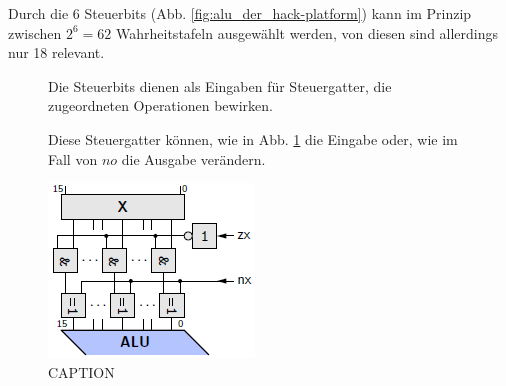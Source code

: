 \documentclass[12pt]{report}
\begin{document}
Durch die 6 Steuerbits (Abb. \ref{fig:alu_der_hack-platform}) kann im Prinzip zwischen 
$2^6=62$ Wahrheitstafeln ausgewählt werden, von diesen sind allerdings nur 18 relevant.

\begin{defbox}
  \begin{figure}[H]
    \begin{minipage}[t]{0.45\textwidth}
      Die Steuerbits dienen als Eingaben für Steuergatter, die zugeordneten
      Operationen bewirken.

      Diese Steuergatter können, wie in Abb. \ref{fig:alu_steuerbits} die Eingabe oder,
      wie im Fall von $no$ die Ausgabe verändern.
    \end{minipage}
    \hfill
    \begin{minipage}[t]{0.45\textwidth}
      \caption{CAPTION}
      \label{fig:alu_steuerbits}
      \centering
      \includegraphics{alu_steuerbits}
    \end{minipage}
  \end{figure}
\end{defbox}
\end{document}
